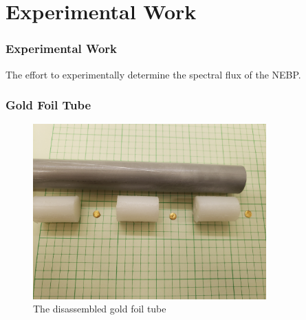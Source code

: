 \documentclass[fleqn]{beamer}
\begin{document}
\section{Experimental Work}
\begin{frame}
\frametitle{Experimental Work}

The effort to experimentally determine the spectral flux of the NEBP.


\end{frame}

\begin{frame}
\frametitle{Gold Foil Tube}

\begin{figure}
\centering
\includegraphics[width = 0.8\textwidth]{foil_tube}
\caption{The disassembled gold foil tube}
\end{figure}


\end{frame}
\end{document}
